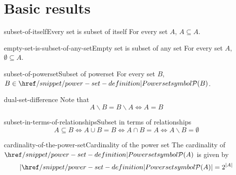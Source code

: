 \documentclass[preview]{standalone}
\begin{document}
\section{Basic results}

\begin{snippetcorollary}{subset-of-itself}{Every set is subset of itself}
    For every set \(A\), \(A \subseteq A\).
\end{snippetcorollary}

\begin{snippetcorollary}{empty-set-is-subset-of-any-set}{Empty set is subset of any set}
    For every set \(A\),
    \(\emptyset \subseteq A\).
\end{snippetcorollary}

\begin{snippetcorollary}{subset-of-powerset}{Subset of powerset}
    For every set \(B\), \(B\in\powerset(B)\).
\end{snippetcorollary}

\begin{snippetcorollary}{dual-set-difference}{}
    Note that
    \[
        A \backslash B = B \backslash A
        \iff A = B
    \]
\end{snippetcorollary}

\begin{snippetcorollary}{subset-in-terms-of-relationships}{Subset in terms of relationships}
    \[
        A \subseteq B
        \iff
        A \cup B = B
        \iff
        A \cap B = A
        \iff
        A \backslash B = \emptyset
    \]
\end{snippetcorollary}

\begin{snippettheorem}{cardinality-of-the-power-set}{Cardinality of the power set}
    The cardinality of \(\powerset(A)\) is given by
    \[
        |\powerset(A)| = 2^{|A|}
    \]
\end{snippettheorem}
\end{document}
